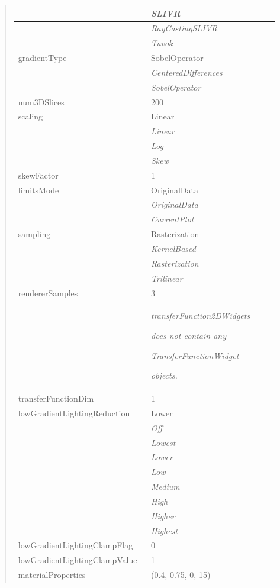 \documentclass[letterpaper,10pt,english]{sphinxmanual}
\begin{document}
\begin{quote}
\begin{longtable}{|p{0.475\linewidth}|p{0.475\linewidth}|}
\hline & 
\emph{SLIVR}
\\
\hline & 
\emph{RayCastingSLIVR}
\\
\hline & 
\emph{Tuvok}
\\
\hline
gradientType
 & 
SobelOperator
\\
\hline & 
\emph{CenteredDifferences}
\\
\hline & 
\emph{SobelOperator}
\\
\hline
num3DSlices
 & 
200
\\
\hline
scaling
 & 
Linear
\\
\hline & 
\emph{Linear}
\\
\hline & 
\emph{Log}
\\
\hline & 
\emph{Skew}
\\
\hline
skewFactor
 & 
1
\\
\hline
limitsMode
 & 
OriginalData
\\
\hline & 
\emph{OriginalData}
\\
\hline & 
\emph{CurrentPlot}
\\
\hline
sampling
 & 
Rasterization
\\
\hline & 
\emph{KernelBased}
\\
\hline & 
\emph{Rasterization}
\\
\hline & 
\emph{Trilinear}
\\
\hline
rendererSamples
 & 
3
\\
\hline & 
\begin{DUlineblock}{0em}
\item[] \emph{transferFunction2DWidgets}
\item[] \emph{does not contain any}
\item[] \emph{TransferFunctionWidget}
\item[] \emph{objects.}
\end{DUlineblock}
\\
\hline
transferFunctionDim
 & 
1
\\
\hline
lowGradientLightingReduction
 & 
Lower
\\
\hline & 
\emph{Off}
\\
\hline & 
\emph{Lowest}
\\
\hline & 
\emph{Lower}
\\
\hline & 
\emph{Low}
\\
\hline & 
\emph{Medium}
\\
\hline & 
\emph{High}
\\
\hline & 
\emph{Higher}
\\
\hline & 
\emph{Highest}
\\
\hline
lowGradientLightingClampFlag
 & 
0
\\
\hline
lowGradientLightingClampValue
 & 
1
\\
\hline
materialProperties
 & 
(0.4, 0.75, 0, 15)
\\
\hline\end{longtable}

\end{quote}
\end{document}
